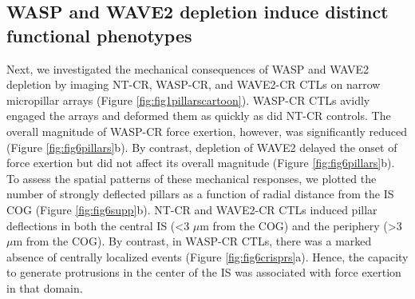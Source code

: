\subsection{WASP and WAVE2 depletion induce distinct functional phenotypes}
Next, we investigated the mechanical consequences of WASP and WAVE2 depletion by imaging NT-CR, WASP-CR, and WAVE2-CR CTLs on narrow micropillar arrays (Figure \ref{fig:fig1pillarscartoon}). WASP-CR CTLs avidly engaged the arrays and deformed them as quickly as did NT-CR controls. The overall magnitude of WASP-CR force exertion, however, was significantly reduced (Figure \ref{fig:fig6pillars}b). By contrast, depletion of WAVE2 delayed the onset of force exertion but did not affect its overall magnitude (Figure \ref{fig:fig6pillars}b). To assess the spatial patterns of these mechanical responses, we plotted the number of strongly deflected pillars as a function of radial distance from the IS COG (Figure \ref{fig:fig6supp}b). NT-CR and WAVE2-CR CTLs induced pillar deflections in both the central IS (\textless 3 $\mu$m from the COG) and the periphery (\textgreater 3 $\mu$m from the COG). By contrast, in WASP-CR CTLs, there was a marked absence of centrally localized events (Figure \ref{fig:fig6crisprs}a). Hence, the capacity to generate protrusions in the center of the IS was associated with force exertion in that domain. 


